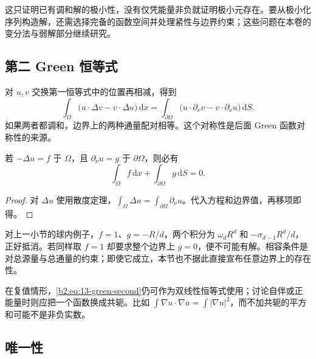 这只证明已有调和解的极小性，没有仅凭能量非负就证明极小元存在。要从极小化序列构造解，还需选择完备的函数空间并处理紧性与边界约束；这些问题在本卷的变分法与弱解部分继续研究。

\subsection{第二 Green 恒等式}
\label{b2:subsec:130202}

对 \(u,v\) 交换第一恒等式中的位置再相减，得到
\begin{equation}\label{b2:eq:13-green-second}
 \int_\Omega\bigl(u\cdot\Delta v-v\cdot\Delta u\bigr)\,\mathrm{d}x
 =\int_{\partial\Omega}
       \bigl(u\cdot\partial_\nu v-v\cdot\partial_\nu u\bigr)\,\mathrm{d}S.
\end{equation}
如果两者都调和，边界上的两种通量配对相等。这个对称性是后面 Green 函数对称性的来源。

\begin{proposition}\label{b2:prop:13-neumann-compatibility}
若 \(-\Delta u=f\) 于 \(\Omega\)，且 \(\partial_\nu u=g\) 于 \(\partial\Omega\)，则必有
\[
 \int_\Omega f\,\mathrm{d}x+\int_{\partial\Omega}g\,\mathrm{d}S=0.
\]
\end{proposition}
\begin{proof}
对 \(\Delta u\) 使用散度定理，\(\int_\Omega\Delta u=\int_{\partial\Omega}\partial_\nu u\)。代入方程和边界值，再移项即得。
\end{proof}

对上一小节的球内例子，\(f=1\)、\(g=-R/d\)，两个积分为 \(\omega_dR^d\) 和 \(-\sigma_{d-1}R^d/d\)，正好抵消。若同样取 \(f=1\) 却要求整个边界上 \(g=0\)，便不可能有解。相容条件是对总源量与总通量的约束；即使它成立，本节也不据此直接宣布任意边界上的存在性。

\ProseParagraphBreak

在复值情形，\eqref{b2:eq:13-green-second}仍可作为双线性恒等式使用；讨论自伴或正能量时则应把一个函数换成共轭。比如 \(\int\nabla u\cdot\nabla\overline u=\int|\nabla u|^2\)，而不加共轭的平方和可能不是非负实数。

\subsection{唯一性}
\label{b2:subsec:130203}

